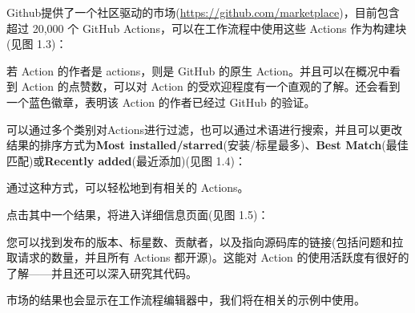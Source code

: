 Github提供了一个社区驱动的市场(\url{https://github.com/marketplace})，目前包含超过 20,000 个 GitHub Actions，可以在工作流程中使用这些 Actions 作为构建块(见图 1.3)：


若 Action 的作者是 actions，则是 GitHub 的原生 Action。并且可以在概况中看到 Action 的点赞数，可以对 Action 的受欢迎程度有一个直观的了解。还会看到一个蓝色徽章，表明该 Action 的作者已经过 GitHub 的验证。

可以通过多个类别对Actions进行过滤，也可以通过术语进行搜索，并且可以更改结果的排序方式为\textbf{Most installed/starred}(安装/标星最多)、\textbf{Best Match}(最佳匹配)或\textbf{Recently added}(最近添加)(见图 1.4)：


通过这种方式，可以轻松地到有相关的 Actions。

点击其中一个结果，将进入详细信息页面(见图 1.5)：


您可以找到发布的版本、标星数、贡献者，以及指向源码库的链接(包括问题和拉取请求的数量，并且所有 Actions 都开源)。这能对 Action 的使用活跃度有很好的了解——并且还可以深入研究其代码。

市场的结果也会显示在工作流程编辑器中，我们将在相关的示例中使用。














